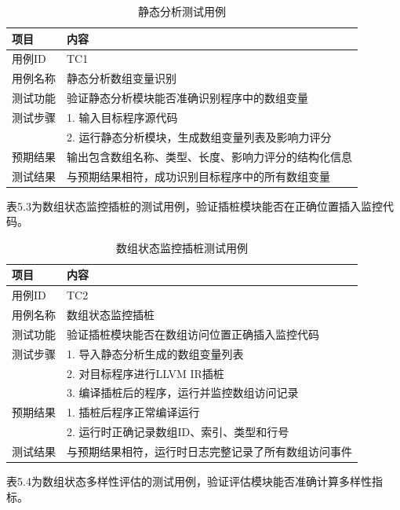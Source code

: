 \documentclass[bachelor]{njupthesis}
\begin{document}
\begin{table}[hbt]
\centering
\caption{静态分析测试用例}
\label{tab:tc1}
\begin{tabular}{ll}
\toprule
\textbf{项目} & \textbf{内容} \\
\midrule
用例ID & TC1 \\
用例名称 & 静态分析数组变量识别 \\
测试功能 & 验证静态分析模块能否准确识别程序中的数组变量 \\
测试步骤 & 1. 输入目标程序源代码 \\
& 2. 运行静态分析模块，生成数组变量列表及影响力评分 \\
预期结果 & 输出包含数组名称、类型、长度、影响力评分的结构化信息 \\
测试结果 & 与预期结果相符，成功识别目标程序中的所有数组变量 \\
\bottomrule
\end{tabular}
\end{table}

表5.3为数组状态监控插桩的测试用例，验证插桩模块能否在正确位置插入监控代码。

\begin{table}[hbt]
\centering
\caption{数组状态监控插桩测试用例}
\label{tab:tc2}
\begin{tabular}{ll}
\toprule
\textbf{项目} & \textbf{内容} \\
\midrule
用例ID & TC2 \\
用例名称 & 数组状态监控插桩 \\
测试功能 & 验证插桩模块能否在数组访问位置正确插入监控代码 \\
测试步骤 & 1. 导入静态分析生成的数组变量列表 \\
& 2. 对目标程序进行LLVM IR插桩 \\
& 3. 编译插桩后的程序，运行并监控数组访问记录 \\
预期结果 & 1. 插桩后程序正常编译运行 \\
& 2. 运行时正确记录数组ID、索引、类型和行号 \\
测试结果 & 与预期结果相符，运行时日志完整记录了所有数组访问事件 \\
\bottomrule
\end{tabular}
\end{table}

表5.4为数组状态多样性评估的测试用例，验证评估模块能否准确计算多样性指标。
\end{document}
